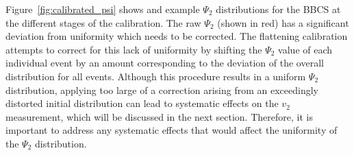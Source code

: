 
Figure~\ref{fig:calibrated_psi} shows and example $\Psi_2$ distributions for the BBCS at the different stages of the calibration. The raw $\Psi_2$ (shown in red) has a significant deviation from uniformity which needs to be corrected. The flattening calibration attempts to correct for this lack of uniformity by shifting the $\Psi_2$ value of each individual event by an amount corresponding to the deviation of the overall distribution for all events. Although this procedure results in a uniform $\Psi_2$ distribution, applying too large of a correction arising from an exceedingly distorted initial distribution can lead to systematic effects on the $v_2$ measurement, which will be discussed in the next section. Therefore, it is important to address any systematic effects that would affect the uniformity of the $\Psi_2$ distribution.
